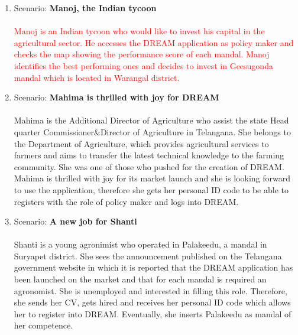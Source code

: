 \begin{enumerate}
\item Scenario: \textbf{Manoj, the Indian tycoon}\\\\
\textcolor{red}{Manoj is an Indian tycoon who would like to invest his capital in the agricultural sector. He accesses the DREAM application as policy maker and checks the map showing the performance score of each mandal. Manoj identifies the best performing ones and decides to invest in Geesugonda mandal which is located in Warangal district.}\\

\item Scenario: \textbf{Mahima is thrilled with joy for DREAM}\\\\
Mahima is the Additional Director of Agriculture who assist the state Head quarter Commissioner\&Director of Agriculture in Telangana. She belongs to the Department of Agriculture, which provides agricultural services to farmers and aims to transfer the latest technical knowledge to the farming community. She was one of those who pushed for the creation of DREAM.
Mahima is thrilled with joy for its market launch and she is looking forward to use the application, therefore she gets her personal ID code to be able to registers with the role of policy maker and logs into DREAM.\\

\item Scenario: \textbf{A new job for Shanti}\\\\
Shanti is a young agronimist who operated in Palakeedu, a mandal in Suryapet district. She sees the announcement published on the Telangana government website in which it is reported that the DREAM application has been launched on the market and that for each mandal is required an agronomist. She is unemployed and interested in filling this role. Therefore, she sends her CV, gets hired and receives her personal ID code which allows her to register into DREAM. Eventually, she inserts Palakeedu as mandal of her competence.\\


\end{enumerate}
